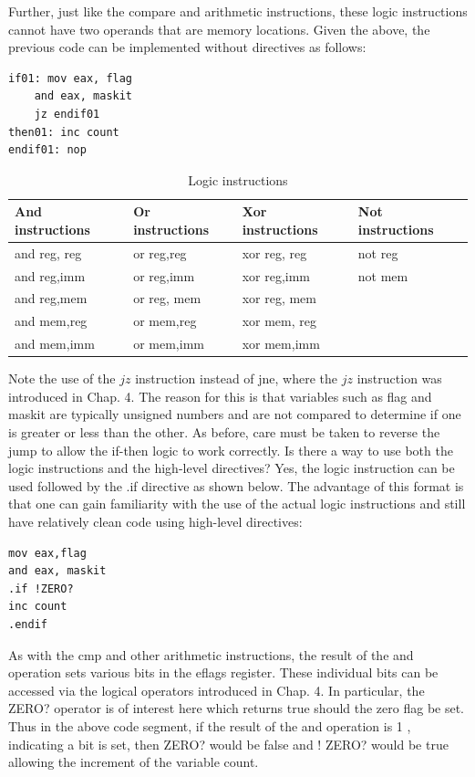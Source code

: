 \documentclass[10pt]{book}
\begin{document}
Further, just like the compare and arithmetic instructions, these logic instructions cannot have two operands that are memory locations. Given the above, the previous code can be implemented without directives as follows:

\begin{verbatim}
if01: mov eax, flag
    and eax, maskit
    jz endif01
then01: inc count
endif01: nop
\end{verbatim}

\begin{table}[h]
\centering
\caption{Logic instructions}
\begin{tabular}{|llll|}
\hline
\textbf{And instructions} & \textbf{Or instructions} & \textbf{Xor instructions} & \textbf{Not instructions} \\
\hline
and reg, reg & or reg,reg & xor reg, reg & not reg \\
and reg,imm & or reg,imm & xor reg,imm & not mem \\
and reg,mem & or reg, mem & xor reg, mem &  \\
and mem,reg & or mem,reg & xor mem, reg &  \\
and mem,imm & or mem,imm & xor mem,imm &  \\
\hline
\end{tabular}
\end{table}

Note the use of the $j z$ instruction instead of jne, where the $j z$ instruction was introduced in Chap. 4. The reason for this is that variables such as flag and maskit are typically unsigned numbers and are not compared to determine if one is greater or less than the other. As before, care must be taken to reverse the jump to allow the if-then logic to work correctly.
Is there a way to use both the logic instructions and the high-level directives? Yes, the logic instruction can be used followed by the .if directive as shown below. The advantage of this format is that one can gain familiarity with the use of the actual logic instructions and still have relatively clean code using high-level directives:

\begin{verbatim}
mov eax,flag
and eax, maskit
.if !ZERO?
inc count
.endif
\end{verbatim}

As with the cmp and other arithmetic instructions, the result of the and operation sets various bits in the eflags register. These individual bits can be accessed via the logical operators introduced in Chap. 4. In particular, the ZERO? operator is of interest here which returns true should the zero flag be set. Thus in the above code segment, if the result of the and operation is 1 , indicating a bit is set, then ZERO? would be false and ! ZERO? would be true allowing the increment of the variable count.
\end{document}
